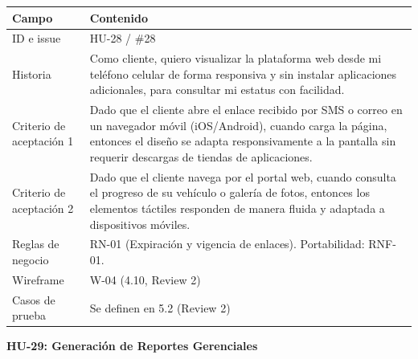 {\def\LTcaptype{none} %
\begin{longtable}[]{@{}
  >{\raggedright\arraybackslash}p{}
  >{\raggedright\arraybackslash}p{}@{}}
\toprule\noalign{}
\begin{minipage}[b]{\linewidth}\raggedright
\textbf{Campo}
\end{minipage} & \begin{minipage}[b]{\linewidth}\raggedright
\textbf{Contenido}
\end{minipage} \\
\midrule\noalign{}
\endhead
\bottomrule\noalign{}
\endlastfoot
ID e issue & HU-28 / \#28 \\
Historia & Como cliente, quiero visualizar la plataforma web desde mi
teléfono celular de forma responsiva y sin instalar aplicaciones
adicionales, para consultar mi estatus con facilidad. \\
Criterio de aceptación 1 & Dado que el cliente abre el enlace recibido
por SMS o correo en un navegador móvil (iOS/Android), cuando carga la
página, entonces el diseño se adapta responsivamente a la pantalla sin
requerir descargas de tiendas de aplicaciones. \\
Criterio de aceptación 2 & Dado que el cliente navega por el portal web,
cuando consulta el progreso de su vehículo o galería de fotos, entonces
los elementos táctiles responden de manera fluida y adaptada a
dispositivos móviles. \\
Reglas de negocio & RN-01 (Expiración y vigencia de enlaces).
Portabilidad: RNF-01. \\
Wireframe & W-04 (4.10, Review 2) \\
Casos de prueba & Se definen en 5.2 (Review 2) \\
\end{longtable}
}

\textbf{HU-29: Generación de Reportes Gerenciales}

